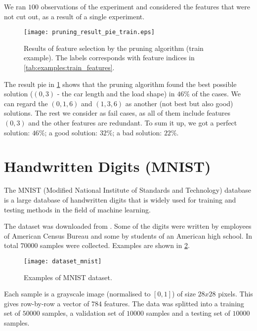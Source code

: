 We ran $ 100 $ observations of the experiment and considered the features that were not cut out, as a result of a single experiment.

\begin{figure}[H]
\centering
\texttt{[image: pruning\_result\_pie\_train.eps]}
\caption{Results of feature selection by the pruning algorithm (train example). The labels corresponds with feature indices in \cref{tab:examples:train_features}.}
\label{fig:examples:pruning_result_pie_train}
\end{figure}

The result pie in \cref{fig:examples:pruning_result_pie_train} shows that the pruning algorithm found the best possible solution ($ (0, 3) $ - the car length and the load shape) in $ 46\% $ of the cases. We can regard the $ (0, 1, 6) $ and $ (1, 3, 6) $ as another (not best but also good) solutions. The rest we consider as fail cases, as all of them include features $ (0, 3) $ and the other features are redundant. To sum it up, we got a perfect solution: $ 46\% $; a good solution: $ 32\% $; a bad solution: $ 22\% $.

\section{Handwritten Digits (MNIST)} \label{sec:example_mnist}
The MNIST (Modified National Institute of Standards and Technology) database \citep{wiki:mnist} is a large database of handwritten digits that is widely used for training and testing methods in the field of machine learning. 

The dataset was downloaded from \citep{online:mnist}. Some of the digits were written by employees of American Census Bureau \citep{online:census} and some by students of an American high school. In total $ 70000 $ samples were collected. Examples are shown in \cref{fig:examples:dataset_mnist}.

\begin{figure}[H]
\centering
\texttt{[image: dataset\_mnist]}
\caption{Examples of MNIST dataset.}
\label{fig:examples:dataset_mnist}
\end{figure}

Each sample is a grayscale image (normalised to $ [0, 1] $) of size $ 28x28 $ pixels. This gives row-by-row a vector of $ 784 $ features. The data was splitted into a training set of $ 50000 $ samples, a validation set of $ 10000 $ samples and a testing set of $ 10000 $ samples.

